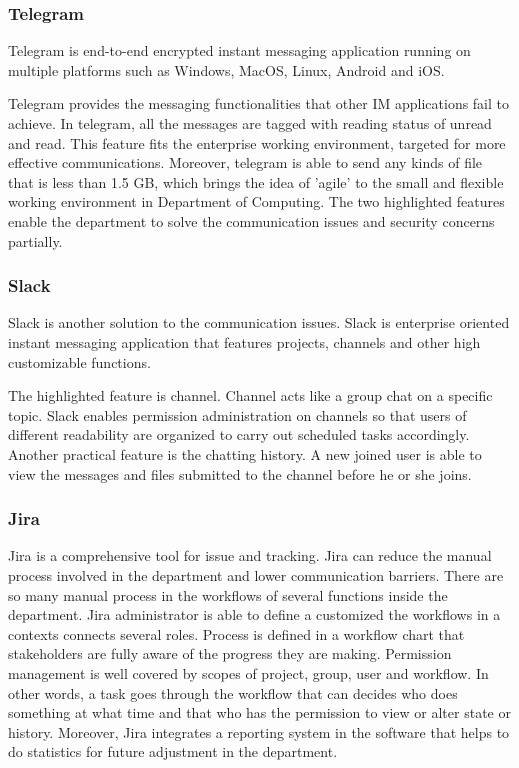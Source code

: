 \subsubsection{Telegram}

Telegram is end-to-end encrypted instant messaging application running on multiple platforms such as Windows, MacOS, Linux, Android and iOS.

Telegram provides the messaging functionalities that other IM applications fail to achieve. In telegram, all the messages are tagged with reading status of unread and read. This feature fits the enterprise working environment, targeted for more effective communications. Moreover, telegram is able to send any kinds of file that is less than 1.5 GB, which brings the idea of 'agile' to the small and flexible working environment in Department of Computing. The two highlighted features enable the department to solve the communication issues and security concerns partially.

\subsubsection{Slack}
Slack is another solution to the communication issues. Slack is enterprise oriented instant messaging application that features projects, channels and other high customizable functions.

The highlighted feature is channel. Channel acts like a group chat on a specific topic. Slack enables permission administration on channels so that users of different readability are organized to carry out scheduled tasks accordingly. Another practical feature is the chatting history. A new joined user is able to view the messages and files submitted to the channel before he or she joins.

\subsubsection{Jira}

Jira is a comprehensive tool for issue and tracking. Jira can reduce the manual process involved in the department and lower communication barriers. There are so many manual process in the workflows of several functions inside the department. Jira administrator is able to define a customized the workflows in a contexts connects several roles. Process is defined in a workflow chart that stakeholders are fully aware of the progress they are making. Permission management is well covered by scopes of project, group, user and workflow. In other words, a task goes through the workflow that can decides who does something at what time and that who has the permission to view or alter state or history. Moreover, Jira integrates a reporting system in the software that helps to do statistics for future adjustment in the department.

